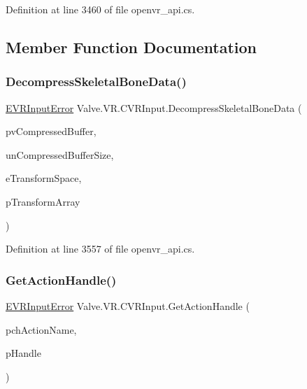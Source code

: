 Definition at line 3460 of file openvr\+\_\+api.\+cs.



\subsection{Member Function Documentation}
\mbox{\label{class_valve_1_1_v_r_1_1_c_v_r_input_a25ce602e817281368b2d79d089c4a16f}} 
\subsubsection{\texorpdfstring{DecompressSkeletalBoneData()}{DecompressSkeletalBoneData()}}
{\footnotesize\ttfamily \mbox{\hyperlink{namespace_valve_1_1_v_r_a592d7f4189b8346d6c96dbdbaa35bc1b}{E\+V\+R\+Input\+Error}} Valve.\+V\+R.\+C\+V\+R\+Input.\+Decompress\+Skeletal\+Bone\+Data (\begin{DoxyParamCaption}\item[{Int\+Ptr}]{pv\+Compressed\+Buffer,  }\item[{uint}]{un\+Compressed\+Buffer\+Size,  }\item[{\mbox{\hyperlink{namespace_valve_1_1_v_r_a916744fb3fc7b8e8ba224fba9bee6de4}{E\+V\+R\+Skeletal\+Transform\+Space}}}]{e\+Transform\+Space,  }\item[{\mbox{\hyperlink{struct_valve_1_1_v_r_1_1_v_r_bone_transform__t}{V\+R\+Bone\+Transform\+\_\+t}} \mbox{[}$\,$\mbox{]}}]{p\+Transform\+Array }\end{DoxyParamCaption})}



Definition at line 3557 of file openvr\+\_\+api.\+cs.

\mbox{\label{class_valve_1_1_v_r_1_1_c_v_r_input_a8db69981ead338c62f3955e9b3a1ac66}} 
\subsubsection{\texorpdfstring{GetActionHandle()}{GetActionHandle()}}
{\footnotesize\ttfamily \mbox{\hyperlink{namespace_valve_1_1_v_r_a592d7f4189b8346d6c96dbdbaa35bc1b}{E\+V\+R\+Input\+Error}} Valve.\+V\+R.\+C\+V\+R\+Input.\+Get\+Action\+Handle (\begin{DoxyParamCaption}\item[{string}]{pch\+Action\+Name,  }\item[{ref ulong}]{p\+Handle }\end{DoxyParamCaption})}



